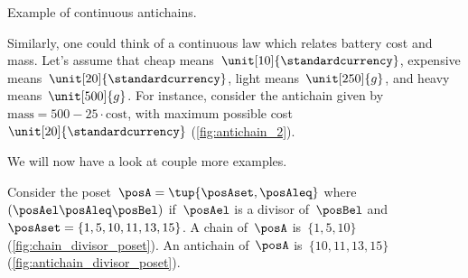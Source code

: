 %
\begin{marginfigure}
	\centering
	\caption{Example of continuous antichains.}
	\label{fig:antichain_2}
\end{marginfigure}

Similarly, one could think of a continuous law which relates battery cost and mass.
Let's assume that cheap means~$\unit[10]{\standardcurrency}$, expensive means~$\unit[20]{\standardcurrency}$, light means~$\unit[250]{g}$, and heavy means~$\unit[500]{g}$.
For instance, consider the antichain given by~$\text{mass}=500-25\cdot \text{cost}$, with maximum possible cost~$\unit[20]{\standardcurrency}$ (\cref{fig:antichain_2}).

We will now have a look at couple more examples.
\begin{example}
	Consider the poset~$\posA=\tup{\posAset,\posAleq}$ where~$(\posAel \posAleq \posBel)$ if~$\posAel$ is a divisor of~$\posBel$ and~$\posAset=\{1,5,10,11,13,15\}$.
	A chain of~$\posA$ is~$\{1,5,10\}$ (\cref{fig:chain_divisor_poset}).
	An antichain of~$\posA$ is~$\{10,11,13,15\}$ (\cref{fig:antichain_divisor_poset}).
\end{example}

\begin{marginfigure}
	\begin{center}
	\end{center}
	\caption{\label{fig:chain_divisor_poset}}
\end{marginfigure}

\begin{marginfigure}
	\begin{center}
	\end{center}
	\caption{\label{fig:antichain_divisor_poset}}
\end{marginfigure}

